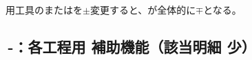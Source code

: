 \begin{marker}
\DimpleMilling 用工具の\TDCValue または\TDCWearValue を$\pm$変更すると、\DimpleDepth が全体的に$\mp$となる。
\end{marker}


\clearpage
\subsection{\,-：各工程用 補助機能（該当明細 少）}


